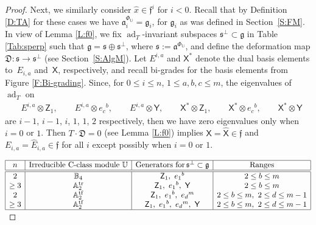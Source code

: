 \documentclass[10pt,a4paper]{amsart}
\newcommand\tensor{\otimes}
\DeclareMathOperator{\tf}{tf}
\DeclareMathOperator{\tr}{tr}
\newcommand\fD{\mathfrak{D}}
\newcommand{\g}{\mathfrak{g}}
\newcommand\ad{\operatorname{ad}}
\newcommand\fa{\mathfrak{a}}
\newcommand\ff{\mathfrak{f}}
\newcommand\fs{\mathfrak{s}}
\newcommand\bbU{\mathbb{U}}
\newcommand\bbA{\mathbb{A}}
\newcommand\bbB{\mathbb{B}}
\newcommand\sfX{\mathsf{X}}
\newcommand\sfY{\mathsf{Y}}
\newcommand\sfZ{\mathsf{Z}}
\numberwithin{equation}{section}
\begin{document}
\begin{proof}
Next, we similarly consider $\widehat{x} \in \ff^i$ for $i <0$. Recall that by Definition \ref{D:TA} for these cases we have $\fa^{\Phi_\bbU}_i = \g_i$, for $\g_i$ as was defined in Section~\ref{S:FM}. In view of Lemma \ref{L:f0}, we fix $\ad_T$-invariant subspaces $\fs^\perp \subset \g$ in Table \ref{Tab:sperp} such that $\g = \fs \oplus \fs^\perp$, where $\fs := \fa^{\Phi_\bbU}$, and define the deformation map $\fD\colon \fs \to \fs^\perp$ (see Section~\ref{S:AlgM}). Let $E^{i,a}$ and $\sfX^\ast$ denote the dual basis elements to~$E_{i,a}$ and~$\sfX$, respectively, and recall bi-grades for the basis elements from Figure \ref{F:Bi-grading}. Since, for $0 \le i \le n$, $1 \le a,b,c \le m$, the eigenvalues of $\ad_T$ on
\begin{align}\label{jac}
&E^{i,a} \tensor \sfZ_1, \qquad E^{i,a} \tensor e_c{}^b,\qquad E^{i,a} \tensor \sfY, \qquad \sfX^\ast \tensor \sfZ_1,\qquad \sfX^\ast \tensor e_c{}^b,\qquad \sfX^\ast \tensor \sfY
\end{align}
are $i-1$, $i-1$, $i$, $1$, $1$, $2$ respectively, then we have zero eigenvalues only when $i=0$ or $1$. Then $T \cdot \fD = 0$ (see Lemma \ref{L:f0}) implies $\sfX =\widehat{\sfX} \in \ff$ and $E_{i,a} = \widehat{E}_{i,a} \in \ff $ for all $i$ except possibly when $i=0$ or $1$.
\begin{table}[ht!]\renewcommand{\arraystretch}{1.2}
\centering
$\begin{array}{|c|c|c|c|} \hline
n & \text{Irreducible C-class module } \bbU & \text{Generators for}\,\fs^\perp \subset \g & \text{Ranges}\\ \hline\hline
2 & \bbB_4 & \sfZ_1, \ e_1{}^b & 2 \le b \le m \\
\ge 3 & \bbA_2^{\tr}&\sfZ_1, \ e_1{}^b, \ \sfY & 2 \le b \le m \\
2 & \bbA_2^{\tf} &
\sfZ_1, \ e_1{}^b, \ e_d{}^m & 2 \le b \le m,\ 2 \le d \le m-1 \\
\ge 3 & \bbA_2^{\tf}&\sfZ_1,\ e_1{}^b, \ e_d{}^m, \ \sfY & 2 \le b \le m,\ 2 \le d \le m-1\\ \hline
\end{array}$
\caption{$\ad_T$-invariant subspace $\fs^\perp \subset \g$ complementary to $\fs=\fa^{\Phi_{\bbU}}$.}
\label{Tab:sperp}
\end{table}	


\end{proof}
\end{document}
